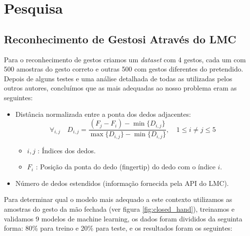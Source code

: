 \documentclass{TTUPhD}
\begin{document}

\section{Pesquisa}

\subsection{Reconhecimento de Gestosi Através do LMC}

Para o reconhecimento de gestos criamos um \textit{dataset} com 4 gestos, cada um com 500 amostras do gesto correto e outras 500
com gestos diferentes do pretendido. Depois de alguns testes e uma análise detalhada de todas as  utilizadas pelos outros autores,
concluímos que as mais adequadas ao nosso problema eram as seguintes:

\begin{itemize}
    \item Distância normalizada entre a ponta dos dedos adjacentes:
    \begin{equation}
        \forall_{i,j} \quad D_{i,j} = \frac{(F_j - F_i) - \min \{D_{i,j}\}}{\max \{D_{i,j}\} - \min \{D_{i,j}\}}, \quad 1 \le i \ne j \le 5
    \end{equation}
        \begin{itemize}
            \item $i, j$ : Índices dos dedos.
            \item $F_i$ : Posição da ponta do dedo (fingertip) do dedo com o índice $i$.
        \end{itemize}
    \item Número de dedos estendidos (informação fornecida pela API do LMC).
\end{itemize}

Para determinar qual o modelo mais adequado a este contexto utilizamos as amostras do gesto da mão fechada (ver figura \ref{fig:closed_hand}),
treinamos e validamos 9 modelos de machine learning, os dados foram divididos da seguinta forma: 80\% para treino e 20\% para teste,
e os resultados foram os seguintes:
\end{document}
